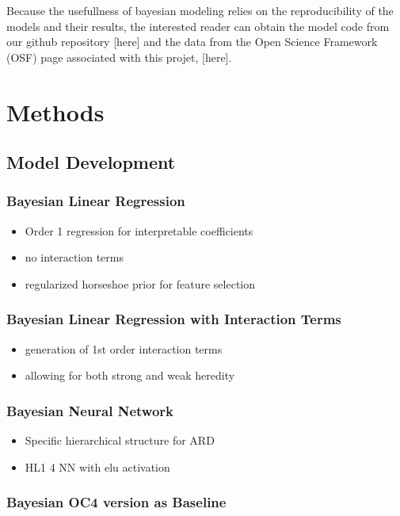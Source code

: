 \documentclass[10pt]{article}
\begin{document}
Because the usefullness of bayesian modeling relies on the reproducibility of the models and their results, the interested reader can obtain the model code from our github repository [here] and the data from the Open Science Framework (OSF) page associated with this projet, [here].
			
\newpage			

\section{Methods}

	\subsection{Model Development}		
		\subsubsection{Bayesian Linear Regression}
			\begin{itemize}
				\item Order 1 regression for interpretable coefficients
				\item no interaction terms
				\item regularized horseshoe prior for feature selection
			\end{itemize}
		\subsubsection{Bayesian Linear Regression with Interaction Terms}
			\begin{itemize}
				\item generation of 1st order interaction terms
				\item allowing for both strong and weak heredity
			\end{itemize}
		\subsubsection{Bayesian Neural Network}
			\begin{itemize}
				\item Specific hierarchical structure for ARD
				\item HL1 4 NN with elu activation
			\end{itemize}
		\subsubsection{Bayesian OC4 version as Baseline}
	
\end{document}
